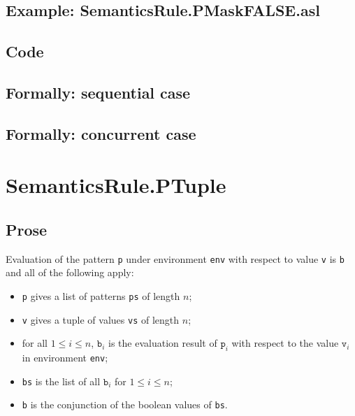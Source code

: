 \documentclass{book}
\begin{document}
    \subsection{Example: SemanticsRule.PMaskFALSE.asl}

  \subsection{Code}

\begin{emptyformal}
  \subsection{Formally: sequential case}

  \subsection{Formally: concurrent case}
\end{emptyformal}


\section{SemanticsRule.PTuple \label{sec:SemanticsRule.PTuple}}

    \subsection{Prose}
    Evaluation of the pattern \texttt{p} under environment \texttt{env} with
    respect to value \texttt{v} is \texttt{b} and all of the following apply:
    \begin{itemize}
      \item \texttt{p} gives a list of patterns \texttt{ps} of length $n$;
      \item \texttt{v} gives a tuple of values \texttt{vs} of length $n$;
      \item for all $1 \leq i \leq n$, $\texttt{b}_i$ is the evaluation result
        of $\texttt{p}_i$ with respect to the value $\texttt{v}_i$ in
        environment \texttt{env};
      \item \texttt{bs} is the list of all $\texttt{b}_i$ for $1 \leq i \leq n$;
      \item \texttt{b} is the conjunction of the boolean values of \texttt{bs}.
    \end{itemize}
\end{document}
